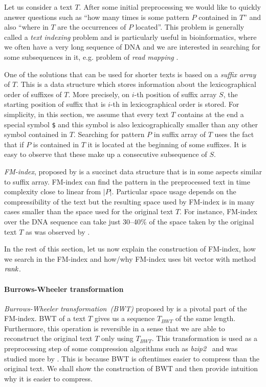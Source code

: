 Let us consider a text $T$. After some initial preprocessing we would like to quickly answer
questions such as ``how many times is some pattern $P$ contained in $T$'' and also ``where in $T$
are the occurrences of $P$ located''. This problem is generally called a \textit{text indexing}
problem and is particularly useful in bioinformatics, where we often have a very long sequence of DNA
and we are interested in searching for some subsequences in it, e.g. problem of \emph{read mapping}
\citep{simpson2010efficient}.

One of the solutions that can be used for shorter texts is based on a \textit{suffix array}
of $T$. This is a data structure which stores information about the lexicographical
order of suffixes of $T$. More precisely, on $i$-th position of suffix array $S$, the starting
position of suffix that is $i$-th in lexicographical order is stored. For simplicity, in this
section, we assume that every text $T$ contains at the end a special symbol {\tt \$} and this
symbol is also lexicographically smaller than any other symbol contained in $T$. Searching for
pattern $P$ in suffix array of $T$ uses the fact that if $P$ is contained in $T$ it is located at
the beginning of some suffixes. It is easy to observe that these make up a consecutive subsequence
of $S$.

\textit{FM-index}, proposed by \cite{ferragina2000opportunistic} is a succinct data structure that
is in some aspects similar to suffix array. FM-index can find the pattern in the preprocessed text
in time complexity close to linear from $|P|$. Particular space usage depends on the compressibility
of the text but the resulting space used by FM-index is in many cases smaller than the space used for
the original text $T$. For instance, FM-index over the DNA sequence can take just 30--40\% of the space
taken by the original text $T$ as was observed by \cite{ferragina2001experimental}.

In the rest of this section, let us now explain the construction of FM-index, how we search in the
FM-index and how/why FM-index uses bit vector with method $\mathit{rank}$.

\paragraph{Burrows-Wheeler transformation}

\textit{Burrows-Wheeler transformation~(BWT)} proposed by \cite{burrows1994block} is a pivotal
part of the FM-index. BWT of a text $T$ gives us a sequence $\mathit{T_{BWT}}$ of the same
length. Furthermore, this operation is reversible in a sense that we are able to reconstruct
the original text $T$ only using $\mathit{T_{BWT}}$. This transformation is used as a
preprocessing step of some compression algorithms such as \textit{bzip2}~\citep{seward1996bzip2}
and was studied more by \cite{manzini2001analysis}. This is because BWT is oftentimes easier
to compress than the original text. We shall show the construction of BWT and then provide
intuition why it is easier to compress.


